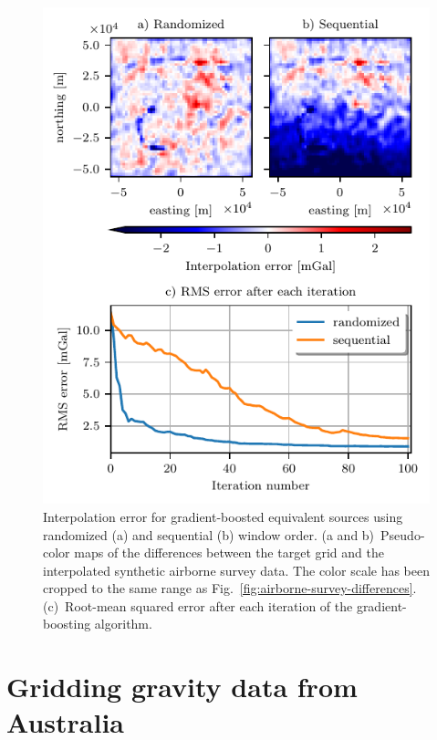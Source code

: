 \begin{figure}
    \includegraphics[width=\linewidth]{figs/eql-boost-airborne.pdf}
    \caption{
        Interpolation error for gradient-boosted equivalent sources using
        randomized (a) and sequential (b) window order.
        (a and b)~Pseudo-color maps of the differences between the target grid
        and the interpolated synthetic airborne survey data.
        The color scale has been cropped to the same range as
        Fig.~\ref{fig:airborne-survey-differences}.
        (c)~Root-mean squared error after each iteration of the
        gradient-boosting algorithm.
}
\label{fig:eql-boost-airborne}
\end{figure}



\section{Gridding gravity data from Australia}

